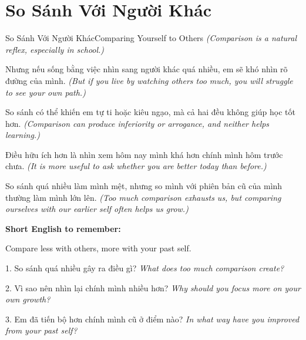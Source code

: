 \section{So Sánh Với Người Khác}
\begin{truyen}{So Sánh Với Người Khác}{Comparing Yourself to Others}
\textit{(Comparison is a natural reflex, especially in school.)}

Nhưng nếu sống bằng việc nhìn sang người khác quá nhiều, em sẽ khó nhìn rõ đường của mình.
\textit{(But if you live by watching others too much, you will struggle to see your own path.)}

So sánh có thể khiến em tự ti hoặc kiêu ngạo, mà cả hai đều không giúp học tốt hơn.
\textit{(Comparison can produce inferiority or arrogance, and neither helps learning.)}

Điều hữu ích hơn là nhìn xem hôm nay mình khá hơn chính mình hôm trước chưa.
\textit{(It is more useful to ask whether you are better today than before.)}
\end{truyen}

\begin{baihoc}
So sánh quá nhiều làm mình mệt, nhưng so mình với phiên bản cũ của mình thường làm mình lớn lên.
\textit{(Too much comparison exhausts us, but comparing ourselves with our earlier self often helps us grow.)}
\end{baihoc}

\begin{ghinhoanh}
\textbf{Short English to remember:}

Compare less with others, more with your past self.

\end{ghinhoanh}

\begin{tuhocnhanh}
1. So sánh quá nhiều gây ra điều gì? \textit{What does too much comparison create?}

2. Vì sao nên nhìn lại chính mình nhiều hơn? \textit{Why should you focus more on your own growth?}

3. Em đã tiến bộ hơn chính mình cũ ở điểm nào? \textit{In what way have you improved from your past self?}
\end{tuhocnhanh}
\ngancach

